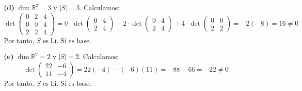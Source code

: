 \begin{prob}
\begin{myproof}
\textbf{(d)} $\dim \mathbb{R}^3 = 3$ y $|S|=3$. Calculamos:
$$\det \begin{pmatrix}0&2&4\\0&0&4\\2&2&4\end{pmatrix} = 0 \cdot \det\begin{pmatrix}0&4\\2&4\end{pmatrix} - 2 \cdot \det\begin{pmatrix}0&4\\2&4\end{pmatrix} + 4 \cdot \det\begin{pmatrix}0&0\\2&2\end{pmatrix} = -2(-8) = 16 \neq 0$$
Por tanto, $S$ es l.i. $\boxed{\text{Sí es base.}}$

\textbf{(e)} $\dim \mathbb{R}^2 = 2$ y $|S|=2$. Calculamos:
$$\det \begin{pmatrix}22&-6\\11&-4\end{pmatrix} = 22(-4) - (-6)(11) = -88 + 66 = -22 \neq 0$$
Por tanto, $S$ es l.i. $\boxed{\text{Sí es base.}}$
\end{myproof}
\end{prob}

